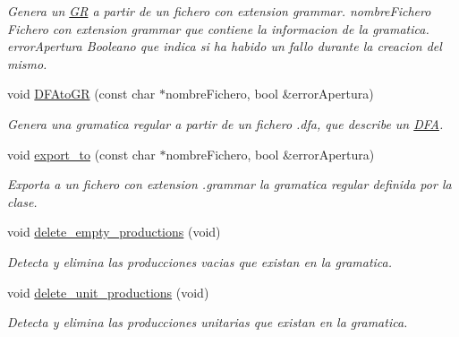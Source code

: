 \begin{DoxyCompactItemize}
\begin{DoxyCompactList}\small\item\em Genera un \hyperlink{class_g_r}{GR} a partir de un fichero con extension \textquotesingle{}grammar\textquotesingle{}. nombre\+Fichero Fichero con extension \textquotesingle{}grammar\textquotesingle{} que contiene la informacion de la gramatica. error\+Apertura Booleano que indica si ha habido un fallo durante la creacion del mismo. \end{DoxyCompactList}\item 
void \hyperlink{class_g_r_adc0dab5f68cf05b04053e9628b470746}{D\+F\+Ato\+GR} (const char $\ast$nombre\+Fichero, bool \&error\+Apertura)
\begin{DoxyCompactList}\small\item\em Genera una gramatica regular a partir de un fichero .dfa, que describe un \hyperlink{class_d_f_a}{D\+FA}. \end{DoxyCompactList}\item 
void \hyperlink{class_g_r_a5c4dca6e2174446585a234b4e8792743}{export\+\_\+to} (const char $\ast$nombre\+Fichero, bool \&error\+Apertura)
\begin{DoxyCompactList}\small\item\em Exporta a un fichero con extension \textquotesingle{}.grammar\textquotesingle{} la gramatica regular definida por la clase. \end{DoxyCompactList}\item 
\mbox{\label{class_g_r_addd51c9b424f72cf8bd77ef0677b31dd}} 
void \hyperlink{class_g_r_addd51c9b424f72cf8bd77ef0677b31dd}{delete\+\_\+empty\+\_\+productions} (void)
\begin{DoxyCompactList}\small\item\em Detecta y elimina las producciones vacias que existan en la gramatica. \end{DoxyCompactList}\item 
\mbox{\label{class_g_r_a5a9d533fffc4572c4d5c1acb3259f3fa}} 
void \hyperlink{class_g_r_a5a9d533fffc4572c4d5c1acb3259f3fa}{delete\+\_\+unit\+\_\+productions} (void)
\begin{DoxyCompactList}\small\item\em Detecta y elimina las producciones unitarias que existan en la gramatica. \end{DoxyCompactList}\item 
\mbox{\label{class_g_r_ae186a3913a607f9a54a5a6dea201f9bb}} 

\end{DoxyCompactItemize}
